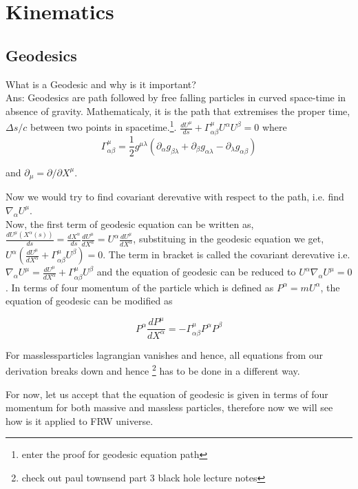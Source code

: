 \documentclass[12pt]{report}
\newcommand{\fn}[1]{\footnote{#1}}
\newcommand{\de}[2]{\frac{d{#1}}{d{#2}}}
\newcommand{\ch}[2]{\Gamma^{#1}_{#2}}
\newcommand{\p}{\partial}
\begin{document}
\section{Kinematics}
\subsection{Geodesics}
What is a Geodesic and why is it important?\\
Ans: Geodesics are path followed by free falling particles in curved space-time in absence of gravity. Mathematicaly, it is the path that extremises the proper time, $\Delta s/c$ between two points in spacetime.\fn{enter the proof for geodesic equation path}. $\de{U^\mu}{s}+\ch{\mu}{\alpha\beta}U^{\alpha}U^{\beta}=0$ where
 \begin{equation*}
\ch{\mu}{\alpha \beta}=\frac{1}{2}g^{\mu \lambda}(\p_{\alpha} g_{\beta \lambda}+\p_\beta g_{\alpha \lambda} - \p_\lambda g_{\alpha \beta})
\end{equation*}

 and $\p_\mu = \p/\p {X}^\mu$.

Now we would try to find covariant derevative with respect to the path, i.e. find 
$\nabla_\alpha U^\mu$.\\
Now, the first term  of geodesic equation can be written as, 
$\de{U^\mu (X^\alpha(s))}{s}=\de{X^\alpha}{s}\de{U^\mu}{X^\alpha}=U^\alpha \de{U^\mu}{X^\alpha}$, substituing in the geodesic  equation we get, $U^\alpha(\de{U^\mu}{X^\alpha}+\ch{\mu}{\alpha\beta}U^{\beta})=0$. The term in bracket is called the covariant derevative i.e. $\nabla_\alpha U^\mu = \de{U^\mu}{X^\alpha}+\ch{\mu}{\alpha\beta}U^{\beta}$ and the equation of geodesic can be reduced to $U^\alpha \nabla_\alpha U^\mu=0$. In terms of four momentum of the particle which is defined as $P^\alpha=mU^\alpha$, the equation of geodesic can be modified as 

\begin{equation}\label{Pgeo}
P^\alpha \de{P^\mu}{X^\alpha}= - \ch{\mu}{\alpha \beta} P^\alpha P^\beta
\end{equation}

 For masslessparticles lagrangian vanishes and hence, all equations from our derivation breaks down and hence \fn{check out paul townsend part 3 black hole lecture notes} has to be done in a  different way. 

For now, let us accept that the equation of geodesic is given in terms of four momentum for both massive and massless particles, therefore now we will see how is it applied to FRW universe.
\end{document}
